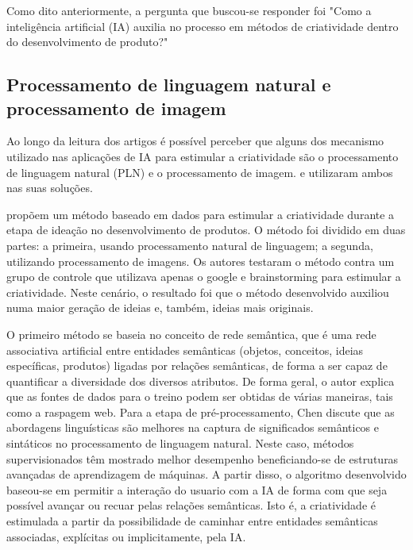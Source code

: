 Como dito anteriormente, a pergunta que buscou-se responder foi "Como a inteligência artificial (IA) auxilia no processo em métodos de criatividade dentro do desenvolvimento de produto?"

\subsection*{Processamento de linguagem natural e processamento de imagem}

Ao longo da leitura dos artigos é possível perceber que alguns dos mecanismo utilizado nas aplicações de IA para estimular a criatividade são o processamento de linguagem natural (PLN) e o processamento de imagem.  e  utilizaram ambos nas suas soluções.

 propõem um método baseado em dados para estimular a criatividade durante a etapa de ideação no desenvolvimento de produtos. O método foi dividido em duas partes: a primeira, usando processamento natural de linguagem; a segunda, utilizando processamento de imagens. Os autores testaram o método contra um grupo de controle que utilizava apenas o google e brainstorming para estimular a criatividade. Neste cenário, o resultado foi que o método desenvolvido auxiliou numa maior geração de ideias e, também, ideias mais originais.

O primeiro método se baseia no conceito de rede semântica, que é uma rede associativa artificial entre entidades semânticas (objetos, conceitos, ideias específicas, produtos) ligadas por relações semânticas, de forma a ser capaz de quantificar a diversidade dos diversos atributos. De forma geral, o autor explica que as fontes de dados  para o treino podem ser obtidas de várias maneiras, tais como a raspagem web. Para a etapa de pré-processamento, Chen discute que as abordagens linguísticas são melhores na captura de significados semânticos e sintáticos no processamento de linguagem natural. Neste caso, métodos supervisionados têm mostrado melhor desempenho beneficiando-se de estruturas avançadas de aprendizagem de máquinas. A partir disso, o algoritmo desenvolvido baseou-se em permitir a interação do usuario com a IA de forma com que seja possível avançar ou recuar pelas relações semânticas. Isto é, a criatividade é estimulada a partir da possibilidade de caminhar entre entidades semânticas associadas, explícitas ou implicitamente, pela IA.

